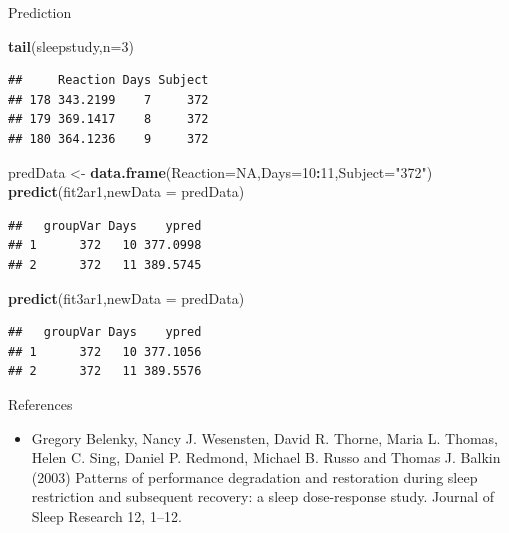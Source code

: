 \documentclass[
  ignorenonframetext,
]{beamer}
\newenvironment{Shaded}{\begin{snugshade}}{\end{snugshade}}
\newcommand{\DataTypeTok}[1]{\textcolor[rgb]{0.13,0.29,0.53}{#1}}
\newcommand{\DecValTok}[1]{\textcolor[rgb]{0.00,0.00,0.81}{#1}}
\newcommand{\KeywordTok}[1]{\textcolor[rgb]{0.13,0.29,0.53}{\textbf{#1}}}
\newcommand{\NormalTok}[1]{#1}
\newcommand{\OperatorTok}[1]{\textcolor[rgb]{0.81,0.36,0.00}{\textbf{#1}}}
\newcommand{\OtherTok}[1]{\textcolor[rgb]{0.56,0.35,0.01}{#1}}
\newcommand{\StringTok}[1]{\textcolor[rgb]{0.31,0.60,0.02}{#1}}
\providecommand{\tightlist}{%
  \setlength{\itemsep}{0pt}\setlength{\parskip}{0pt}}
\begin{document}
\begin{frame}[fragile]{Prediction}
\protect\hypertarget{prediction}{}

\scriptsize

\begin{Shaded}
\begin{Highlighting}[]
\KeywordTok{tail}\NormalTok{(sleepstudy,}\DataTypeTok{n=}\DecValTok{3}\NormalTok{)}
\end{Highlighting}
\end{Shaded}

\begin{verbatim}
##     Reaction Days Subject
## 178 343.2199    7     372
## 179 369.1417    8     372
## 180 364.1236    9     372
\end{verbatim}

\begin{Shaded}
\begin{Highlighting}[]
\NormalTok{predData <-}\StringTok{ }\KeywordTok{data.frame}\NormalTok{(}\DataTypeTok{Reaction=}\OtherTok{NA}\NormalTok{,}\DataTypeTok{Days=}\DecValTok{10}\OperatorTok{:}\DecValTok{11}\NormalTok{,}\DataTypeTok{Subject=}\StringTok{"372"}\NormalTok{)}
\KeywordTok{predict}\NormalTok{(fit2ar1,}\DataTypeTok{newData =}\NormalTok{ predData)}
\end{Highlighting}
\end{Shaded}

\begin{verbatim}
##   groupVar Days    ypred
## 1      372   10 377.0998
## 2      372   11 389.5745
\end{verbatim}

\begin{Shaded}
\begin{Highlighting}[]
\KeywordTok{predict}\NormalTok{(fit3ar1,}\DataTypeTok{newData =}\NormalTok{ predData)}
\end{Highlighting}
\end{Shaded}

\begin{verbatim}
##   groupVar Days    ypred
## 1      372   10 377.1056
## 2      372   11 389.5576
\end{verbatim}

\end{frame}

\begin{frame}{References}
\protect\hypertarget{references}{}

\begin{itemize}
\tightlist
\item
  Gregory Belenky, Nancy J. Wesensten, David R. Thorne, Maria L. Thomas,
  Helen C. Sing, Daniel P. Redmond, Michael B. Russo and Thomas J.
  Balkin (2003) Patterns of performance degradation and restoration
  during sleep restriction and subsequent recovery: a sleep
  dose-response study. Journal of Sleep Research 12, 1--12.
\end{itemize}

\end{frame}
\end{document}
